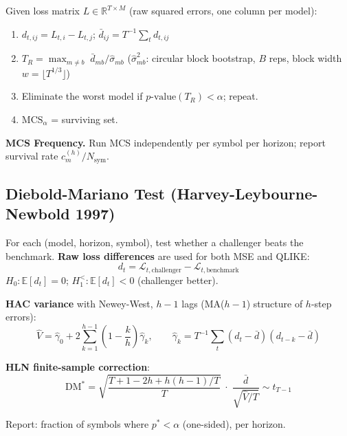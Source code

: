 \documentclass[11pt, a4paper]{article}
\newcommand{\E}{\mathbb{E}}
\newcommand{\R}{\mathbb{R}}
\begin{document}
Given loss matrix $L \in \R^{T\times M}$ (raw squared errors, one column per model):
\begin{enumerate}\itemsep0pt
  \item $d_{t,ij} = L_{t,i} - L_{t,j}$;\quad
        $\bar{d}_{ij} = T^{-1}\!\sum_t d_{t,ij}$
  \item $T_R = \max_{m\neq b}\; \bar{d}_{mb}/\hat{\sigma}_{mb}$
        \quad ($\hat{\sigma}^2_{mb}$: circular block bootstrap, $B$ reps,
        block width $w = \lfloor T^{1/3} \rfloor$)
  \item Eliminate the worst model if $p\text{-value}(T_R) < \alpha$; repeat.
  \item $\mathrm{MCS}_\alpha$ = surviving set.
\end{enumerate}

\textbf{MCS Frequency.} Run MCS independently per symbol per horizon;
report survival rate $c_m^{(h)} / N_{\mathrm{sym}}$.

\subsection{Diebold-Mariano Test (Harvey-Leybourne-Newbold 1997)}

For each (model, horizon, symbol), test whether a challenger beats the benchmark.
\textbf{Raw loss differences} are used for both MSE and QLIKE:
\begin{equation}
  d_t = \mathcal{L}_{t,\mathrm{challenger}} - \mathcal{L}_{t,\mathrm{benchmark}}
\end{equation}
$H_0\!: \E[d_t]=0$;\; $H_1^{<}\!: \E[d_t]<0$ (challenger better).

\textbf{HAC variance} with Newey-West, $h-1$ lags
(MA($h-1$) structure of $h$-step errors):
\begin{equation}
  \hat{V} = \hat{\gamma}_0 + 2\sum_{k=1}^{h-1}
            \left(1 - \frac{k}{h}\right)\hat{\gamma}_k,
  \qquad \hat{\gamma}_k = T^{-1}\sum_t (d_t-\bar d)(d_{t-k}-\bar d)
\end{equation}

\textbf{HLN finite-sample correction}:
\begin{equation}
  \mathrm{DM}^* = \sqrt{\frac{T+1-2h+h(h-1)/T}{T}}\;\cdot\;
                  \frac{\bar{d}}{\sqrt{\hat{V}/T}}
  \sim t_{T-1}
\end{equation}

Report: fraction of symbols where $p^* < \alpha$ (one-sided), per horizon.

\end{document}
